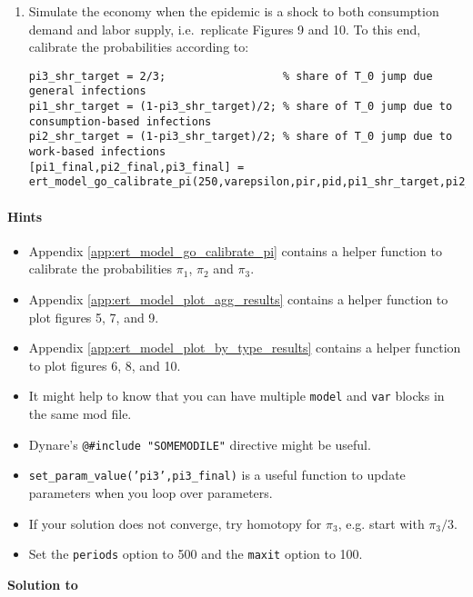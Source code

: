 \begin{enumerate}
\item Simulate the economy when the epidemic is a shock to both consumption demand and labor supply,
  i.e.\ replicate Figures 9 and 10.
To this end, calibrate the probabilities according to:

{\footnotesize
\begin{lstlisting}[style=Matlab-editor,basicstyle=\mlttfamily\scriptsize]
pi3_shr_target = 2/3;                  % share of T_0 jump due general infections
pi1_shr_target = (1-pi3_shr_target)/2; % share of T_0 jump due to consumption-based infections
pi2_shr_target = (1-pi3_shr_target)/2; % share of T_0 jump due to work-based infections
[pi1_final,pi2_final,pi3_final] = ert_model_go_calibrate_pi(250,varepsilon,pir,pid,pi1_shr_target,pi2_shr_target,RplusD_target,c_ss,n_ss);
\end{lstlisting}
}
    
\end{enumerate}


\paragraph{Hints}

\begin{itemize}

\item Appendix \ref{app:ert_model_go_calibrate_pi} contains a helper function to calibrate the probabilities $\pi_1$, $\pi_2$ and $\pi_3$.
    
\item Appendix \ref{app:ert_model_plot_agg_results} contains a helper function to plot figures 5, 7, and 9.

\item Appendix \ref{app:ert_model_plot_by_type_results} contains a helper function to plot figures 6, 8, and 10.

\item It might help to know that you can have multiple \texttt{model} and \texttt{var} blocks in the same mod file.

\item Dynare's \texttt{@\#include "SOMEMODILE"} directive might be useful.

\item \texttt{set\_param\_value('pi3',pi3\_final)} is a useful function to update parameters when you loop over parameters.

\item If your solution does not converge, try homotopy for $\pi_3$, e.g. start with $\pi_3/3$.

\item Set the \texttt{periods} option to 500 and the \texttt{maxit} option to 100.

\end{itemize}


\begin{solution}\textbf{Solution to }
\ifDisplaySolutions

\fi
\newpage
\end{solution}